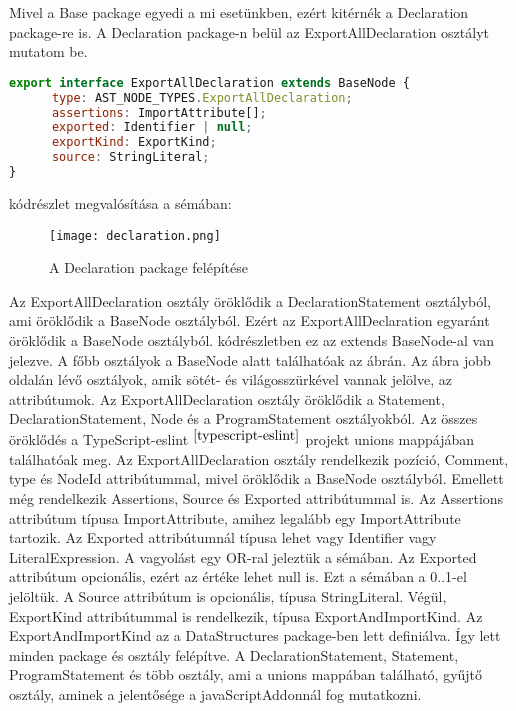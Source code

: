 \noindent

Mivel a Base package egyedi a mi esetünkben, ezért kitérnék a Declaration package-re is.
A Declaration package-n belül az ExportAllDeclaration osztályt mutatom be.

\begin{lstlisting}[caption={ExportAllDeclaration TypeScript megvalósítása},label={lst:ExportAllDeclaration}, language={JavaScript}]
export interface ExportAllDeclaration extends BaseNode {
      type: AST_NODE_TYPES.ExportAllDeclaration;
      assertions: ImportAttribute[];
      exported: Identifier | null;
      exportKind: ExportKind;
      source: StringLiteral;
}
\end{lstlisting}

 kódrészlet megvalósítása a sémában:

\begin{figure}[!htbp]
      \caption{A Declaration package felépítése}\label{fig:declaration_vpp}
      \centering
      \texttt{[image: declaration.png]}
\end{figure}

Az ExportAllDeclaration osztály öröklődik a DeclarationStatement osztályból, ami öröklődik a BaseNode osztályból.
Ezért az ExportAllDeclaration egyaránt öröklődik a BaseNode osztályból.
 kódrészletben ez az extends BaseNode-al van jelezve.
A főbb osztályok a BaseNode alatt találhatóak az ábrán.
Az ábra jobb oldalán lévő osztályok, amik sötét- és világosszürkével vannak jelölve, az attribútumok.
Az ExportAllDeclaration osztály öröklődik a Statement, DeclarationStatement, Node és a ProgramStatement osztályokból.
Az összes öröklődés a TypeScript-eslint$^{~\cite{typescript-eslint}}$ projekt unions mappájában találhatóak meg.
Az ExportAllDeclaration osztály rendelkezik pozíció, Comment, type és NodeId attribútummal, mivel öröklődik a BaseNode osztályból.
Emellett még rendelkezik Assertions, Source és Exported attribútummal is.
Az Assertions attribútum típusa ImportAttribute, amihez legalább egy ImportAttribute tartozik.
Az Exported attribútumnál típusa lehet vagy Identifier vagy LiteralExpression.
A vagyolást egy OR-ral jeleztük a sémában.
Az Exported attribútum opcionális, ezért az értéke lehet null is. Ezt a sémában a 0..1-el jelöltük.
A Source attribútum is opcionális, típusa StringLiteral.
Végül, ExportKind attribútummal is rendelkezik, típusa ExportAndImportKind.
Az ExportAndImportKind az a DataStructures package-ben lett definiálva.
Így lett minden package és osztály felépítve.
A DeclarationStatement, Statement, ProgramStatement és több osztály, ami a unions mappában található, gyűjtő osztály, aminek a jelentősége a javaScriptAddonnál fog mutatkozni.

